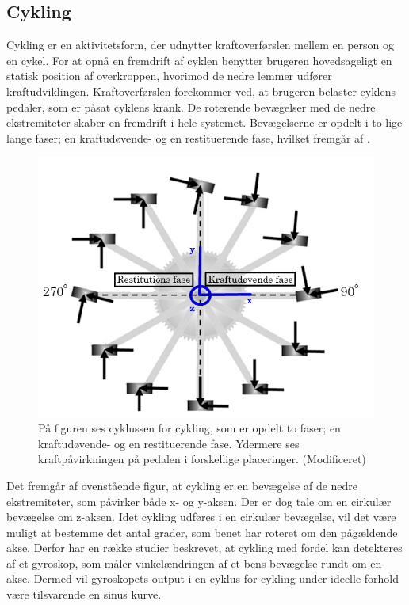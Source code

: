 \subsection{Cykling}
Cykling er en aktivitetsform, der udnytter kraftoverførslen mellem en person og en cykel. For at opnå en fremdrift af cyklen benytter brugeren hovedsageligt en statisk position af overkroppen, hvorimod de nedre lemmer udfører kraftudviklingen. \citep{Springer2014} Kraftoverførslen forekommer ved, at brugeren belaster cyklens pedaler, som er påsat cyklens krank. De roterende bevægelser med de nedre ekstremiteter skaber en fremdrift i hele systemet. Bevægelserne er opdelt i to lige lange faser; en kraftudøvende- og en restituerende fase, hvilket fremgår af .
\begin{figure}[H]
	\centering
	\includegraphics[scale=0.45]{figures/bProblemloesning/cykel_cyklus.png}
	\caption{På figuren ses cyklussen for cykling, som er opdelt to faser; en kraftudøvende- og en restituerende fase. Ydermere ses kraftpåvirkningen på pedalen i forskellige placeringer. \citep{Springer2014} (Modificeret)}
	\label{fig:cykel_cyklus}
\end{figure}
Det fremgår af ovenstående figur, at cykling er en bevægelse af de nedre ekstremiteter, som påvirker både x- og y-aksen. Der er dog tale om en cirkulær bevægelse om z-aksen. Idet cykling udføres i en cirkulær bevægelse, vil det være muligt at bestemme det antal grader, som benet har roteret om den pågældende akse. Derfor har en række studier beskrevet, at cykling med fordel kan detekteres af et gyroskop, som måler vinkelændringen af et bens bevægelse rundt om en akse. Dermed vil gyroskopets output i en cyklus for cykling under ideelle forhold være tilsvarende en sinus kurve. \citep{Cockcroft2011,Marin-PerianuMarin-Perianu2013} 
%
%
%
